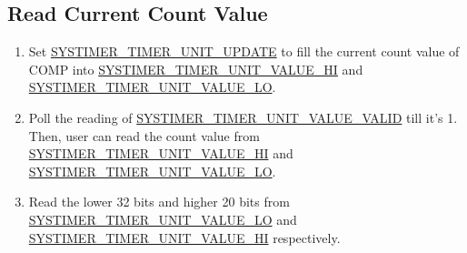 \documentclass[main\_\_EN.tex]{subfiles}
\begin{document}
\subsection{Read Current Count Value}\label{sec:to-read-system-timer-value}
\begin{enumerate}
    \item Set \hyperref[fielddesc:SYSTIMERTIMERUNIT0UPDATE]{SYSTIMER\_TIMER\_UNIT\_UPDATE} to fill the current count value of COMP into \hyperref[fielddesc:SYSTIMERTIMERUNIT0VALUEHI]{SYSTIMER\_TIMER\_UNIT\_VALUE\_HI} and \hyperref[fielddesc:SYSTIMERTIMERUNIT0VALUELO]{SYSTIMER\_TIMER\_UNIT\_VALUE\_LO}.
    \item Poll the reading of \hyperref[fielddesc:SYSTIMERTIMERUNIT0VALUEVALID]{SYSTIMER\_TIMER\_UNIT\_VALUE\_VALID} till it's 1. Then, user can read the count value from \hyperref[fielddesc:SYSTIMERTIMERUNIT0VALUEHI]{SYSTIMER\_TIMER\_UNIT\_VALUE\_HI} and \hyperref[fielddesc:SYSTIMERTIMERUNIT0VALUELO]{SYSTIMER\_TIMER\_UNIT\_VALUE\_LO}.
    \item Read the lower 32 bits and higher 20 bits from \hyperref[fielddesc:SYSTIMERTIMERUNIT0VALUELO]{SYSTIMER\_TIMER\_UNIT\_VALUE\_LO} and \hyperref[fielddesc:SYSTIMERTIMERUNIT0VALUEHI]{SYSTIMER\_TIMER\_UNIT\_VALUE\_HI} respectively.
\end{enumerate}
\end{document}
